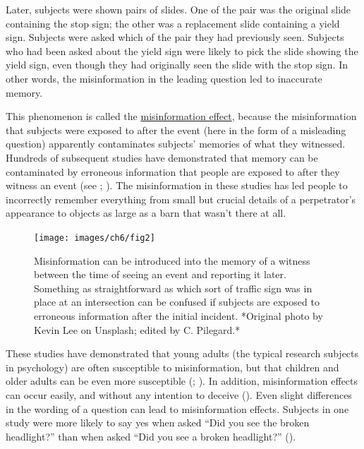 \documentclass[
]{krantz}
\begin{document}
Later, subjects were shown pairs of slides. One of the pair was the original slide containing the stop sign; the other was a replacement slide containing a yield sign. Subjects were asked which of the pair they had previously seen. Subjects who had been asked about the yield sign were likely to pick the slide showing the yield sign, even though they had originally seen the slide with the stop sign. In other words, the misinformation in the leading question led to inaccurate memory.

This phenomenon is called the \hyperref[misinformation-effect]{misinformation effect}, because the misinformation that subjects were exposed to after the event (here in the form of a misleading question) apparently contaminates subjects' memories of what they witnessed. Hundreds of subsequent studies have demonstrated that memory can be contaminated by erroneous information that people are exposed to after they witness an event (see ; ). The misinformation in these studies has led people to incorrectly remember everything from small but crucial details of a perpetrator's appearance to objects as large as a barn that wasn't there at all.

\begin{figure}

{\centering \texttt{[image: images/ch6/fig2]} 

}

\caption{Misinformation can be introduced into the memory of a witness between the time of seeing an event and reporting it later. Something as straightforward as which sort of traffic sign was in place at an intersection can be confused if subjects are exposed to erroneous information after the initial incident. *Original photo by Kevin Lee on Unsplash; edited by C. Pilegard.*}\label{fig:trafficsign}
\end{figure}

These studies have demonstrated that young adults (the typical research subjects in psychology) are often susceptible to misinformation, but that children and older adults can be even more susceptible (; ). In addition, misinformation effects can occur easily, and without any intention to deceive (). Even slight differences in the wording of a question can lead to misinformation effects. Subjects in one study were more likely to say yes when asked ``Did you see the broken headlight?'' than when asked ``Did you see a broken headlight?'' ().
\end{document}
